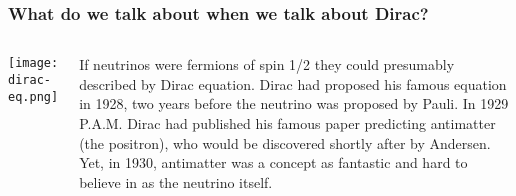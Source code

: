 \begin{frame}
\frametitle{What do we talk about when we talk about Dirac?}
\begin{columns}
\texttt{[image: dirac-eq.png]}
 
If neutrinos were fermions of spin 1/2 they could presumably described by Dirac equation. Dirac had proposed his famous equation in 1928, two years before the neutrino was proposed by Pauli.  In 1929 P.A.M. Dirac had published his famous paper predicting antimatter (the positron), who would be discovered shortly after by Andersen. Yet, in 1930, antimatter was a concept as fantastic and hard to believe in as the neutrino itself.  

\end{columns}
\end{frame}
